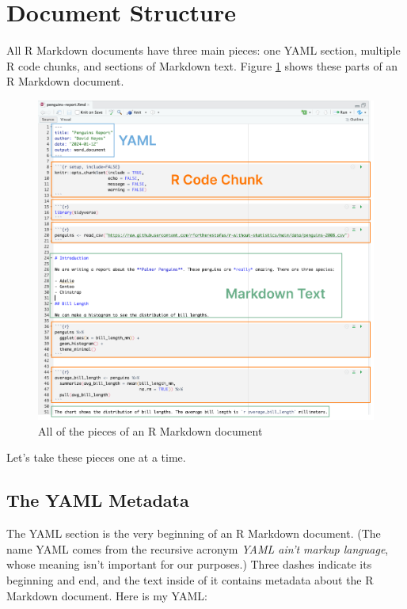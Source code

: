 \documentclass[
]{book}
\begin{document}
\hypertarget{document-structure}{%
\section*{Document Structure}\label{document-structure}}

All R Markdown documents have three main pieces: one YAML section, multiple R code chunks, and sections of Markdown text. Figure \ref{fig:rmarkdown-pieces} shows these parts of an R Markdown document.

\begin{figure}
\includegraphics[width=1\linewidth]{assets/rmarkdown-pieces} \caption{All of the pieces of an R Markdown document}\label{fig:rmarkdown-pieces}
\end{figure}

Let's take these pieces one at a time.

\hypertarget{the-yaml-metadata}{%
\subsection*{The YAML Metadata}\label{the-yaml-metadata}}

The YAML section is the very beginning of an R Markdown document. (The name YAML comes from the recursive acronym \emph{YAML ain't markup language}, whose meaning isn't important for our purposes.) Three dashes indicate its beginning and end, and the text inside of it contains metadata about the R Markdown document. Here is my YAML:
\end{document}
